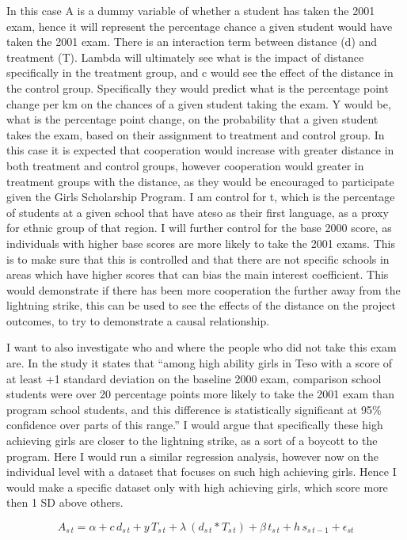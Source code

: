 \documentclass{article}
\begin{document}
In this case A is a dummy variable of whether a student has taken the 2001 exam, hence it will represent the percentage chance a given student would have taken the 2001 exam. There is an interaction term between distance (d) and treatment (T). Lambda will ultimately see what is the impact of distance specifically in the treatment group, and c would see the effect of the distance in the control group. Specifically they would predict what is the percentage point change per km on the chances of a given student taking the exam. Y would be, what is the percentage point change, on the probability that a given student takes the exam, based on their assignment to treatment and control group. In this case it is expected that cooperation would increase with greater distance in both treatment and control groups, however cooperation would greater in treatment groups with the distance, as they would be encouraged to participate given the Girls Scholarship Program. I am control for t, which is the percentage of students at a given school that have ateso as their first language, as a proxy for ethnic group of that region. I will further control for the base 2000 score, as individuals with higher base scores are more likely to take the 2001 exams. This is to make sure that this is controlled and that there are not specific schools in areas which have higher scores that can bias the main interest coefficient. This would demonstrate if there has been more cooperation the further away from the lightning strike, this can be used to see the effects of the distance on the project outcomes, to try to demonstrate a causal relationship. 

I want to also investigate who and where the people who did not take this exam are. In the study it states that “among high ability girls in Teso with a score of at least +1 standard deviation on the baseline 2000 exam, comparison school students were over 20 percentage points more likely to take the 2001 exam than program school students, and this difference is statistically significant at 95\% confidence over parts of this range.” I would argue that specifically these high achieving girls are closer to the lightning strike, as a sort of a boycott to the program. Here I would run a similar regression analysis, however now on the individual level with a dataset that focuses on such high achieving girls. Hence I would make a specific dataset only with high achieving girls, which score more then 1 SD above others. 

\[ A_{s\,t} = \alpha + c\,d_{s\,t} + y\,T_{s\,t} +  \lambda\ (d_{s\,t}* T_{s\,t})+\beta \,t_{s\,t}+h\, s_{s\,t-1}+ \epsilon_{s t}\]
\end{document}
